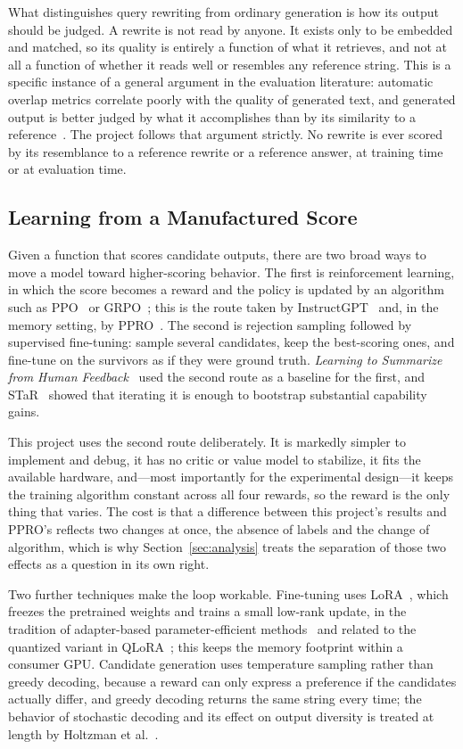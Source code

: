 \documentclass[12pt,letterpaper,oneside]{report}
\begin{document}
What distinguishes query rewriting from ordinary generation is how its output
should be judged. A rewrite is not read by anyone. It exists only to be
embedded and matched, so its quality is entirely a function of what it
retrieves, and not at all a function of whether it reads well or resembles any
reference string. This is a specific instance of a general argument in the
evaluation literature: automatic overlap metrics correlate poorly with the
quality of generated text, and generated output is better judged by what it
accomplishes than by its similarity to a reference~\cite{hownot}. The project
follows that argument strictly. No rewrite is ever scored by its resemblance to
a reference rewrite or a reference answer, at training time or at evaluation
time.

\subsection{Learning from a Manufactured Score}
\label{sec:concept-learning}

Given a function that scores candidate outputs, there are two broad ways to
move a model toward higher-scoring behavior. The first is reinforcement
learning, in which the score becomes a reward and the policy is updated by an
algorithm such as PPO~\cite{ppo} or GRPO~\cite{grpo}; this is the route taken by
InstructGPT~\cite{instructgpt} and, in the memory setting, by PPRO~\cite{ppro}.
The second is rejection sampling followed by supervised fine-tuning: sample
several candidates, keep the best-scoring ones, and fine-tune on the survivors
as if they were ground truth. \emph{Learning to Summarize from Human
Feedback}~\cite{summarize} used the second route as a baseline for the first,
and STaR~\cite{star} showed that iterating it is enough to bootstrap
substantial capability gains.

This project uses the second route deliberately. It is markedly simpler to
implement and debug, it has no critic or value model to stabilize, it fits the
available hardware, and---most importantly for the experimental design---it
keeps the training algorithm constant across all four rewards, so the reward is
the only thing that varies. The cost is that a difference between this project's
results and PPRO's reflects two changes at once, the absence of labels and the
change of algorithm, which is why Section~\ref{sec:analysis} treats the
separation of those two effects as a question in its own right.

Two further techniques make the loop workable. Fine-tuning uses
LoRA~\cite{lora}, which freezes the pretrained weights and trains a small
low-rank update, in the tradition of adapter-based parameter-efficient
methods~\cite{adapters} and related to the quantized variant in
QLoRA~\cite{qlora}; this keeps the memory footprint within a consumer GPU.
Candidate generation uses temperature sampling rather than greedy decoding,
because a reward can only express a preference if the candidates actually
differ, and greedy decoding returns the same string every time; the behavior of
stochastic decoding and its effect on output diversity is treated at length by
Holtzman et al.~\cite{nucleus}.
\end{document}
